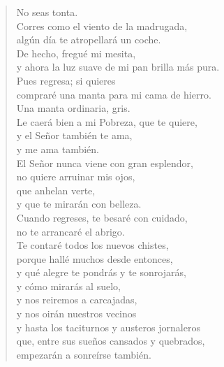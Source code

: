 \documentclass[11pt]{book}
\newcommand*{\centeredornament}{\centerline{\pgfornament[width=6cm]{88}}}
\begin{document}
\newpage

\vspace*{-15mm}
\centeredornament




\begin{verse}
  No seas tonta. \\
  Corres como el viento de la madrugada, \\
  algún día te atropellará un coche. \\
  De hecho, fregué mi mesita, \\
  y ahora la luz suave de mi pan brilla más pura.\hspace*{-1mm} \\
  Pues regresa; si quieres \\
  compraré una manta para mi cama de hierro. \\
  Una manta ordinaria, gris. \\
  Le caerá bien a mi Pobreza, que te quiere, \\
  y el Señor también te ama, \\
  y me ama también. \\
  El Señor nunca viene con gran esplendor, \\
  no quiere arruinar mis ojos, \\
  que anhelan verte, \\
  y que te mirarán con belleza. \\
  Cuando regreses, te besaré con cuidado, \\
  no te arrancaré el abrigo. \\
  Te contaré todos los nuevos chistes, \\
  porque hallé muchos desde entonces, \\
  y qué alegre te pondrás y te sonrojarás, \\
  y cómo mirarás al suelo, \\
  y nos reiremos a carcajadas, \\
  y nos oirán nuestros vecinos \\
  y hasta los taciturnos y austeros jornaleros \\
  que, entre sus sueños cansados y quebrados, \\
  empezarán a sonreírse también.
\end{verse}

\newpage
\end{document}
